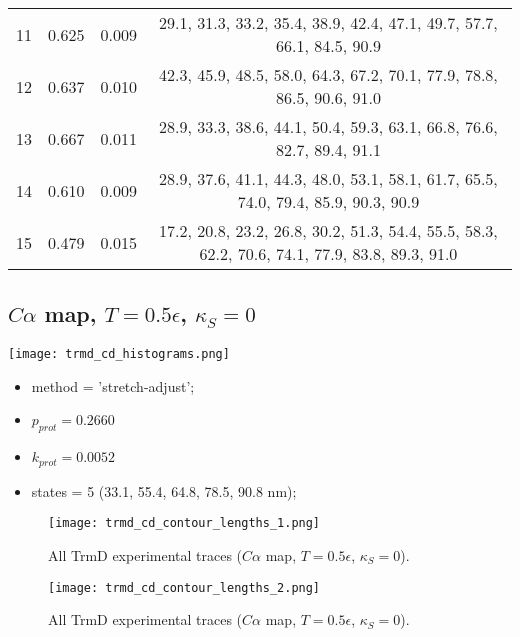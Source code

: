 \begin{table}
\begin{tabular}{c|c|c|c}
        11 & 0.625 & 0.009 & 29.1, 31.3, 33.2, 35.4, 38.9, 42.4, 47.1, 49.7, 57.7, 66.1, 84.5, 90.9\\
        12 & 0.637 & 0.010 & 42.3, 45.9, 48.5, 58.0, 64.3, 67.2, 70.1, 77.9, 78.8, 86.5, 90.6, 91.0\\
        13 & 0.667 & 0.011 & 28.9, 33.3, 38.6, 44.1, 50.4, 59.3, 63.1, 66.8, 76.6, 82.7, 89.4, 91.1\\
        14 & 0.610 & 0.009 & 28.9, 37.6, 41.1, 44.3, 48.0, 53.1, 58.1, 61.7, 65.5, 74.0, 79.4, 85.9, 90.3, 90.9\\
        15 & 0.479 & 0.015 & 17.2, 20.8, 23.2, 26.8, 30.2, 51.3, 54.4, 55.5, 58.3, 62.2, 70.6, 74.1, 77.9, 83.8, 89.3, 91.0\\\hline
    \end{tabular}
\end{table}

\subsection{$C\alpha$ map, $T=0.5\epsilon$, $\kappa_S=0$}
\label{subsec:trmd-cd}
\begin{minipage}[c]{0.7\textwidth}
    \texttt{[image: trmd\_cd\_histograms.png]}
\end{minipage}
\hfill
\begin{minipage}[c]{0.45\textwidth}
    \begin{itemize}
        \item method = 'stretch-adjust';
        \item $p_{prot}=0.2660$
        \item $k_{prot}=0.0052$
        \item states = 5 (33.1, 55.4, 64.8, 78.5, 90.8 nm);
    \end{itemize}
\end{minipage}

\begin{figure}
    \centering
    \texttt{[image: trmd\_cd\_contour\_lengths\_1.png]}
    \caption{All TrmD experimental traces ($C\alpha$ map, $T=0.5\epsilon$, $\kappa_S=0$).}
    \label{fig:trmd-cd-cl1}
\end{figure}

\begin{figure}
    \centering
    \texttt{[image: trmd\_cd\_contour\_lengths\_2.png]}
    \caption{All TrmD experimental traces ($C\alpha$ map, $T=0.5\epsilon$, $\kappa_S=0$).}
    \label{fig:trmd-cd-cl2}
\end{figure}

